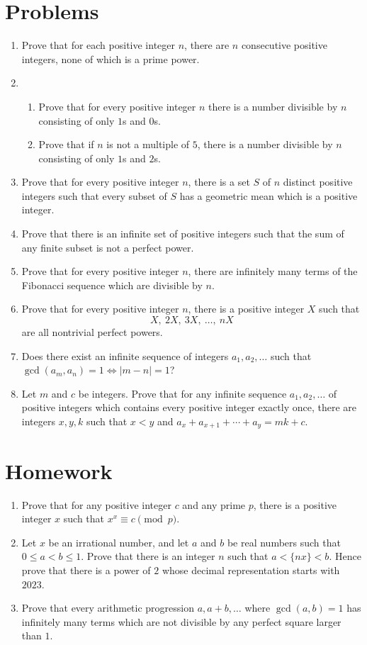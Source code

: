 \documentclass{article}
\begin{document}
\section{Problems}
\begin{enumerate}
  \item Prove that for each positive integer $n$, there are $n$ consecutive
    positive integers, none of which is a prime power.
  \item
    \begin{enumerate}
      \item 
        Prove that for every positive integer $n$ there is a number divisible by
        $n$ consisting of only $1$s and $0$s.
      \item Prove that if $n$ is not a multiple of $5$, there is a number
        divisible by $n$ consisting of only $1$s and $2$s.
    \end{enumerate}
  \item Prove that for every positive integer $n$, there is a set $S$ of $n$
    distinct positive integers such that every subset of $S$ has a geometric
    mean which is a positive integer.
  \item Prove that there is an infinite set of positive integers such that the
    sum of any finite subset is not a perfect power.
  \item Prove that for every positive integer $n$, there are infinitely many
    terms of the Fibonacci sequence which are divisible by $n$.
  \item Prove that for every positive integer $n$, there is a positive integer
    $X$ such that \[X,\ 2X,\ 3X,\ \ldots,\ nX\] are all nontrivial perfect powers.
  \item Does there exist an infinite sequence of integers $a_1,a_2,\ldots$ such
    that $\gcd(a_m,a_n)=1\iff |m-n|=1$?
  \item Let $m$ and $c$ be integers.
    Prove that for any infinite sequence $a_1,a_2,\ldots$ of positive integers which
    contains every positive integer exactly once, there
    are integers $x,y,k$ such that $x<y$ and $a_x+a_{x+1}+\cdots+a_y=mk+c$.
\end{enumerate}
\newpage
\section{Homework}
\begin{enumerate}
  \item Prove that for any positive integer $c$ and any prime $p$, there is a
    positive integer $x$ such that $x^x\equiv c\pmod p$.
  \item Let $x$ be an irrational number, and let $a$ and $b$ be real numbers
    such that $0\le a<b\le 1$. Prove that there is an integer $n$ such that
    $a<\{nx\}<b$. Hence prove that there is a power of $2$ whose decimal
    representation starts with $2023$.
  \item Prove that every arithmetic progression $a,a+b,\ldots$ where
    $\gcd(a,b)=1$ has infinitely many terms which are not divisible by any
    perfect square larger than $1$.
\end{enumerate}
\end{document}

